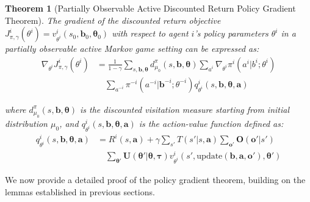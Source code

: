 \documentclass[a4paper,12pt]{report}
\newtheorem{theorem}{Theorem}
\begin{document}
\begin{theorem}[Partially Observable Active Discounted Return Policy Gradient
        Theorem]
    The gradient of the discounted return objective $J^{i}_{\pi, \gamma}(\theta^{i}) = v
            ^{i}_{\theta^i}(s_{0}, \boldsymbol{b}_{0}, \boldsymbol{\theta}_{0})$ with respect
    to agent $i$'s policy parameters $\theta^{i}$ in a partially observable active
    Markov game setting can be expressed as:
    \begin{align}
        \nabla_{\theta^i}J^{i}_{\pi, \gamma}(\theta^{i}) & = \frac{1}{1-\gamma}\sum_{s, \boldsymbol{b}, \boldsymbol{\theta}}d^{\pi}_{\mu_0}(s, \boldsymbol{b}, \boldsymbol{\theta}) \sum_{a^i}\nabla_{\theta^i}\pi^{i}(a^{i}|b^{i}; \theta^{i}) \nonumber \\
                                                         & \quad \sum_{a^{-i}}\pi^{-i}(a^{-i}|\boldsymbol{b}^{-i}; \theta^{-i}) q^{i}_{\theta^i}(s, \boldsymbol{b}, \boldsymbol{\theta}, \boldsymbol{a})
    \end{align}

    where $d^{\pi}_{\mu_0}(s, \boldsymbol{b}, \boldsymbol{\theta})$ is the discounted
    visitation measure starting from initial distribution $\mu_{0}$, and
    $q^{i}_{\theta^i}(s, \boldsymbol{b}, \boldsymbol{\theta}, \boldsymbol{a})$ is
    the action-value function defined as:
    \begin{align}
        q^{i}_{\theta^i}(s, \boldsymbol{b}, \boldsymbol{\theta}, \boldsymbol{a}) & = R^{i}(s, \boldsymbol{a}) + \gamma \sum_{s'}T(s'|s, \boldsymbol{a}) \sum_{\boldsymbol{o}'}\boldsymbol{O}(\boldsymbol{o}'|s') \nonumber                                                                                 \\
                                                                                 & \quad \sum_{\boldsymbol{\theta}'}\boldsymbol{U}(\boldsymbol{\theta}'|\boldsymbol{\theta}, \boldsymbol{\tau}) v^{i}_{\theta^i}(s', \text{update}(\boldsymbol{b}, \boldsymbol{a}, \boldsymbol{o}'), \boldsymbol{\theta}')
    \end{align}
\end{theorem}We now provide a detailed proof of the policy gradient theorem, building
on the lemmas established in previous sections.
\end{document}
